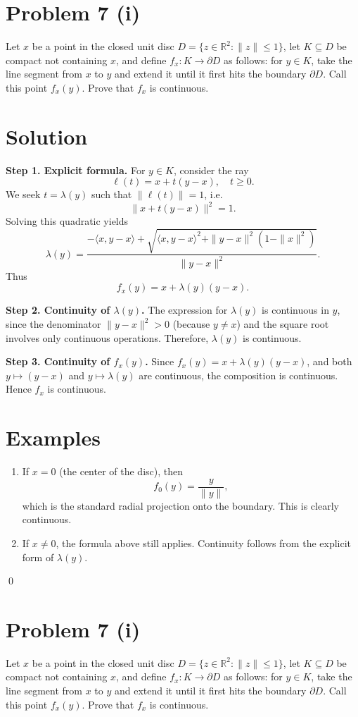 \documentclass[11pt,a4paper]{article}
\theoremstyle{definition}
\theoremstyle{definition}
\theoremstyle{plain}
\theoremstyle{remark}
\begin{document}
\section*{Problem 7 (i)}
Let $x$ be a point in the closed unit disc $D=\{z\in\mathbb{R}^2 : \|z\|\leq 1\}$, let $K\subseteq D$ be compact not containing $x$, and define $f_x:K\to \partial D$ as follows: for $y\in K$, take the line segment from $x$ to $y$ and extend it until it first hits the boundary $\partial D$. Call this point $f_x(y)$. Prove that $f_x$ is continuous.

\section*{Solution}
\textbf{Step 1. Explicit formula.}  
For $y\in K$, consider the ray
\[
\ell(t) = x + t(y-x), \quad t\geq 0.
\]
We seek $t=\lambda(y)$ such that $\|\ell(t)\|=1$, i.e.
\[
\|x + t(y-x)\|^2 = 1.
\]
Solving this quadratic yields
\[
\lambda(y) = \frac{-\langle x, y-x \rangle + \sqrt{\langle x,y-x\rangle^2 + \|y-x\|^2(1-\|x\|^2)}}{\|y-x\|^2}.
\]
Thus
\[
f_x(y) = x + \lambda(y)(y-x).
\]

\medskip

\textbf{Step 2. Continuity of $\lambda(y)$.}  
The expression for $\lambda(y)$ is continuous in $y$, since the denominator $\|y-x\|^2>0$ (because $y\neq x$) and the square root involves only continuous operations. Therefore, $\lambda(y)$ is continuous.

\medskip

\textbf{Step 3. Continuity of $f_x(y)$.}  
Since $f_x(y) = x + \lambda(y)(y-x)$, and both $y\mapsto (y-x)$ and $y\mapsto \lambda(y)$ are continuous, the composition is continuous. Hence $f_x$ is continuous.

\medskip

\section*{Examples}
\begin{enumerate}
	\item If $x=0$ (the center of the disc), then
	\[
	f_0(y) = \frac{y}{\|y\|},
	\]
	which is the standard radial projection onto the boundary. This is clearly continuous.
	\item If $x\neq 0$, the formula above still applies. Continuity follows from the explicit form of $\lambda(y)$.
\end{enumerate}
\qed

\section*{Problem 7 (i)}
Let $x$ be a point in the closed unit disc $D=\{z\in\mathbb{R}^2 : \|z\|\leq 1\}$, let $K\subseteq D$ be compact not containing $x$, and define $f_x:K\to \partial D$ as follows: for $y\in K$, take the line segment from $x$ to $y$ and extend it until it first hits the boundary $\partial D$. Call this point $f_x(y)$. Prove that $f_x$ is continuous.
\end{document}
